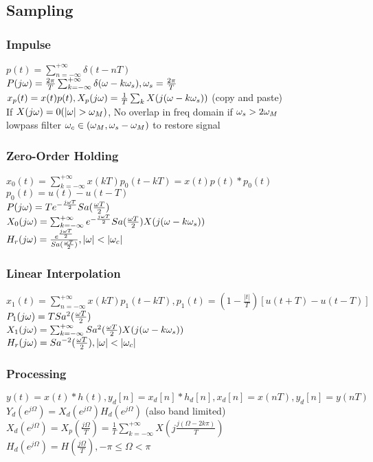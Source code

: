 \subsection{Sampling}
\subsubsection*{Impulse}
$p(t)=\sum_{n=-\infty}^{+\infty} \delta(t-nT)$\\
$P(j\omega)=\frac{2\pi}{T}\sum_{k=-\infty}^{+\infty} \delta(\omega-k\omega_s), \omega_s=\frac{2\pi}{T}$\\
$x_p(t)=x(t)p(t), X_p(j\omega) = \frac{1}{T}\sum_k X(j(\omega-k\omega_s))$ (copy and paste)\\
If $X(j\om)=0(|\om|>\om_M)$, No overlap in freq domain if $\omega_s>2\omega_M$\\
lowpass filter $\omega_c\in(\omega_M,\omega_s - \omega_M)$ to restore signal
\subsubsection*{Zero-Order Holding}
$x_0(t)=\sum_{k=-\infty}^{+\infty} x(kT)p_0(t-kT)=x(t)p(t)*p_0(t)$\\
$ p_0(t)=u(t)-u(t-T)$\\
$P(j\omega)=Te^{-\frac{j\omega T}{2}} Sa(\frac{\omega T}{2})$\\
$X_0(j\omega)=\sum_{k=-\infty}^{+\infty} e^{-\frac{j\omega T}{2}} Sa(\frac{\omega T}{2}) X(j(\omega-k\omega_s))$\\
$H_{r}(j\om) =\frac{e^{\frac{j\om T}2}}{Sa(\frac{\om T}{2})}, |\om|<|\om_c|$\\
\subsubsection*{Linear Interpolation}
$x_1(t)=\sum_{n=-\infty}^{+\infty} x(kT)p_1(t-kT), p_1(t)=(1-\frac{|t|}{T})[u(t+T)-u(t-T)]$\\
$P_1(j\omega)=TSa^2(\frac{\omega T}{2})$\\
$X_1(j\omega)=\sum_{k=-\infty}^{+\infty}Sa^2(\frac{\omega T}{2})X(j(\omega-k\omega_s))$\\
$H_r(j\om)=Sa^{-2}(\frac{\om T}{2}), |\om|<|\om_c|$
\subsubsection*{Processing}
$y(t)=x(t)*h(t), y_d[n]=x_d[n]*h_d[n], x_d[n]=x(nT), y_d[n]=y(nT)$\\
$Y_d(e^{j\Omega})=X_d(e^{j\Omega})H_d(e^{j\Omega})$ (also band limited)\\
$X_d(e^{j\Omega})=X_p(\frac{j\Omega}{T})=\frac 1 T\sum_{k=-\infty}^{+\infty} X(j\frac{j(\Omega-2k\pi)}{T})$\\
$H_d(e^{j\Omega})=H(\frac{j\Omega}{T}), -\pi\le \Omega<\pi$